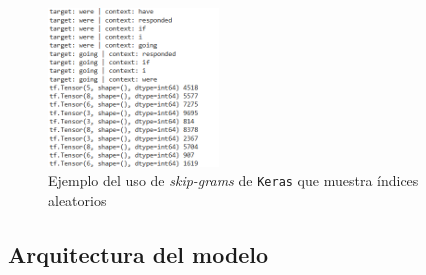 \begin{figure}[H]
    \centering
    \includegraphics[height = 4.2cm]{ImagenesLatex/random_skip.png}{}
    \caption{Ejemplo del uso de \textit{skip-grams} de \texttt{Keras} que muestra índices aleatorios}
    \label{fig:random_skip}
\end{figure}

\vspace{5px}

\subsection{Arquitectura del modelo}

